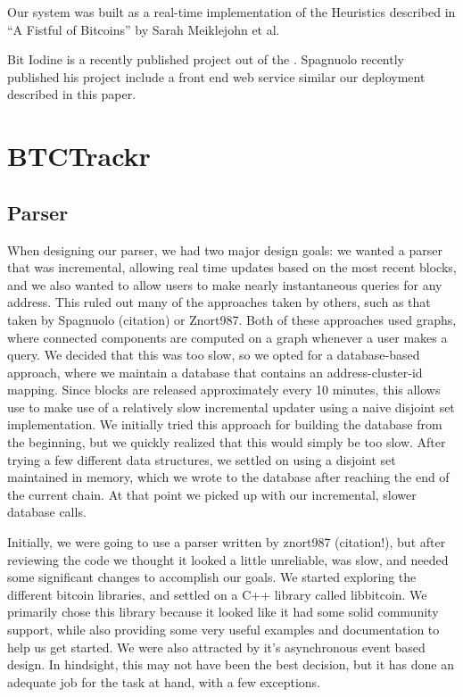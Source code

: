 \documentclass[10pt, letterpaper, twocolumn, twoside]{article}
\begin{document}
Our system was built as a real-time implementation of the Heuristics described in ``A Fistful of Bitcoins'' by Sarah Meiklejohn et al. 

Bit Iodine is a recently published project out of the . Spagnuolo recently published his project include a front end web service similar our deployment described in this paper.

\section{BTCTrackr}

\subsection{Parser}
When designing our parser, we had two major design goals: we wanted a parser that was incremental, allowing real time updates based on the most recent blocks, and we also wanted to allow users to make nearly instantaneous queries for any address. This ruled out many of the approaches taken by others, such as that taken by Spagnuolo (citation) or Znort987. Both of these approaches used graphs, where connected components are computed on a graph whenever a user makes a query. We decided that this was too slow, so we opted for a database-based approach, where we maintain a database that contains an address-cluster-id mapping. Since blocks are released
approximately every 10 minutes, this allows use to make use of a relatively slow incremental updater using a naive disjoint set implementation. We initially tried this approach for building the database from the beginning, but we quickly realized that this would simply be too slow. After trying a few different data structures, we settled on using a disjoint set maintained in memory, which we wrote to the database after reaching the end of the current chain. At that point we picked up with our incremental, slower database calls. 

Initially, we were going to use a parser written by znort987 (citation!), but after reviewing the code we thought it looked a little unreliable, was slow, and needed some significant changes to accomplish our goals. We started exploring the different bitcoin libraries, and settled on a C++ library called libbitcoin. We primarily chose this library because it looked like it had some solid community support, while also providing some very useful examples and documentation to help us get started. We were also attracted by it's asynchronous event based design. In hindsight, this may not have been the best decision, but it has done an adequate job for the task at hand, with a few exceptions.
\end{document}
